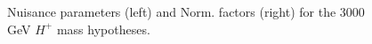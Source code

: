 \begin{figure}[H]
  \centering
  \caption{Nuisance parameters (left) and Norm. factors (right) for the 3000 GeV $H^{+}$ mass hypotheses.}
  \label{fig:Prefit_Hp3000_Blind}
\end{figure}
